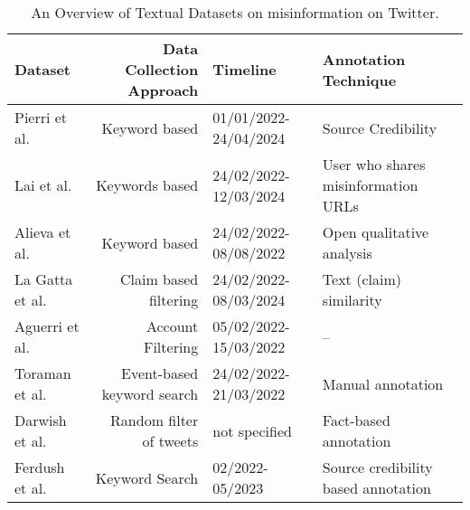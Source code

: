 \begin{table*}[!htbp]
    \centering
    \small
    \caption{An Overview of Textual Datasets on misinformation on Twitter.} %
        \renewcommand{\familydefault}{\ttdefault}
\begin{tabular}{ p{2.2cm}rlp{5cm}  }  %
 \toprule

Dataset & Data Collection Approach & Timeline & Annotation Technique\\ \midrule
Pierri et al. \cite{pierri2023propaganda} & Keyword based & 01/01/2022-24/04/2024 & Source Credibility \\ 

Lai et al. \cite{lai2024multilingual} & Keywords based & 24/02/2022-12/03/2024 & User who shares misinformation URLs \\

Alieva et al. \cite{alieva2022investigating}& Keyword based & 24/02/2022-08/08/2022 & Open qualitative analysis \\

La Gatta et al. \cite{la2023retrieving} & Claim based filtering & 24/02/2022-08/03/2024 & Text (claim) similarity\\

Aguerri et al. \cite{aguerri2024fight} & Account Filtering & 05/02/2022-15/03/2022 & -- \\

Toraman et al. \cite{toraman2024mide22} & Event-based keyword search & 24/02/2022-21/03/2022 & Manual annotation\\

Darwish et al. \cite{darwish2023identifying} & Random filter of tweets & not specified & Fact-based annotation \\

Ferdush et al. \cite{ferdush2023detecting} & Keyword Search & 02/2022-05/2023 & Source credibility based annotation \\
\bottomrule 

    \end{tabular}%
    \label{ex:misinfodata}%
\end{table*}%



